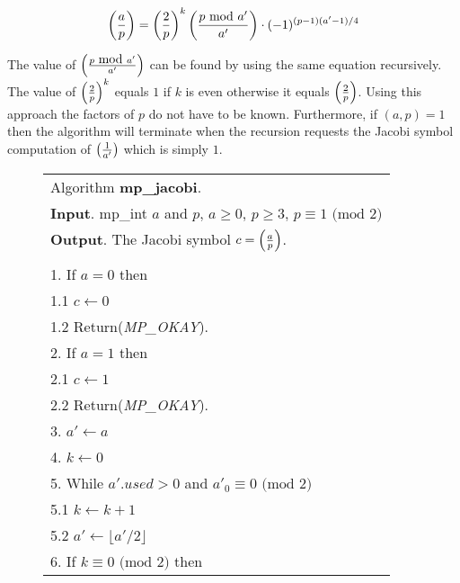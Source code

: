 \documentclass[b5paper]{book}
\begin{document}
\begin{equation}
\left ( { a \over p } \right ) = \left ( {2 \over p } \right )^k \left ( {{p\mbox{ mod }a'} \over a'} \right )  \cdot (-1)^{(p-1)(a'-1)/4} 
\end{equation}

The value of $\left ( {{p \mbox{ mod }a'} \over a'} \right )$ can be found by using the same equation recursively.  The value of 
$\left ( {2 \over p } \right )^k$ equals $1$ if $k$ is even otherwise it equals $\left ( {2 \over p } \right )$.  Using this approach the 
factors of $p$ do not have to be known.  Furthermore, if $(a, p) = 1$ then the algorithm will terminate when the recursion requests the 
Jacobi symbol computation of $\left ( {1 \over a'} \right )$ which is simply $1$.  

\newpage\begin{figure}[!here]
\begin{small}
\begin{center}
\begin{tabular}{l}
\hline Algorithm \textbf{mp\_jacobi}. \\
\textbf{Input}.   mp\_int $a$ and $p$, $a \ge 0$, $p \ge 3$, $p \equiv 1 \mbox{ (mod }2\mbox{)}$ \\
\textbf{Output}.  The Jacobi symbol $c = \left ( {a \over p } \right )$. \\
\hline \\
1.  If $a = 0$ then \\
\hspace{3mm}1.1  $c \leftarrow 0$ \\
\hspace{3mm}1.2  Return(\textit{MP\_OKAY}). \\
2.  If $a = 1$ then \\
\hspace{3mm}2.1  $c \leftarrow 1$ \\
\hspace{3mm}2.2  Return(\textit{MP\_OKAY}). \\
3.  $a' \leftarrow a$ \\
4.  $k \leftarrow 0$ \\
5.  While $a'.used > 0$ and $a'_0 \equiv 0 \mbox{ (mod }2\mbox{)}$ \\
\hspace{3mm}5.1  $k \leftarrow k + 1$ \\
\hspace{3mm}5.2  $a' \leftarrow \lfloor a' / 2 \rfloor$ \\
6.  If $k \equiv 0 \mbox{ (mod }2\mbox{)}$ then \\

\end{tabular}
\end{center}
\end{small}
\end{figure}
\end{document}

